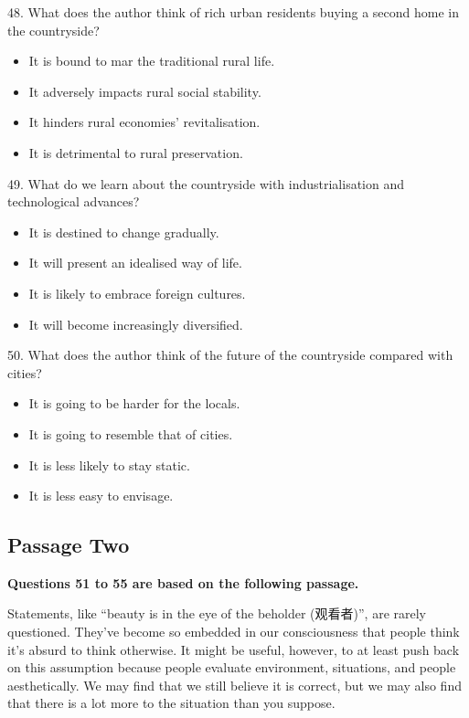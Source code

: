 \documentclass[UTF8,11pt]{ctexart}
\begin{document}
48. What does the author think of rich urban residents buying a second home in the countryside?


\begin{itemize}[leftmargin=2em,itemsep=.2em,topsep=.4em]\item[A.] It is bound to mar the traditional rural life.
\item[B.] It adversely impacts rural social stability.
\item[C.] It hinders rural economies’ revitalisation.
\item[D.] It is detrimental to rural preservation.
\end{itemize}

49. What do we learn about the countryside with industrialisation and technological advances?


\begin{itemize}[leftmargin=2em,itemsep=.2em,topsep=.4em]\item[A.] It is destined to change gradually.
\item[B.] It will present an idealised way of life.
\item[C.] It is likely to embrace foreign cultures.
\item[D.] It will become increasingly diversified.
\end{itemize}

50. What does the author think of the future of the countryside compared with cities?


\begin{itemize}[leftmargin=2em,itemsep=.2em,topsep=.4em]\item[A.] It is going to be harder for the locals.
\item[B.] It is going to resemble that of cities.
\item[C.] It is less likely to stay static.
\item[D.] It is less easy to envisage.
\end{itemize}

\subsection*{\textbf{Passage Two}}


\textbf{Questions 51 to 55 are based on the following passage.}


Statements, like “beauty is in the eye of the beholder (观看者)”, are rarely questioned. They’ve become so embedded in our consciousness that people think it’s absurd to think otherwise. It might be useful, however, to at least push back on this assumption because people evaluate environment, situations, and people aesthetically. We may find that we still believe it is correct, but we may also find that there is a lot more to the situation than you suppose.
\end{document}
